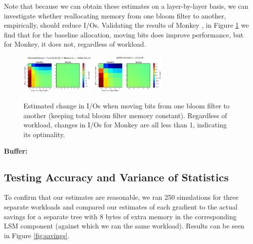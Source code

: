 \documentclass{sig-alternate-05-2015}
\begin{document}
Note that because we can obtain these estimates on a layer-by-layer basis, we can investigate whether reallocating memory from one bloom filter to another, empirically, should reduce I/Os. Validating the results of Monkey \cite{monkey}, in Figure \ref{fig:bloom-realloc} we find that for the baseline allocation, moving bits does improve performance, but for Monkey, it does not, regardless of workload.

\begin{figure}[!htb]
\begin{center}
\includegraphics[width=0.33\textwidth]{bloom-moves-disc.png}
\includegraphics[width=0.33\textwidth]{bloom-moves-zipf.png}
\end{center}
\caption{Estimated change in I/Os when moving bits from one bloom filter to another (keeping total bloom filter memory constant). Regardless of workload, changes in I/Os for Monkey are all less than 1, indicating its optimality.}
\label{fig:bloom-realloc}
\end{figure}

\textbf{Buffer:}

\subsection{Testing Accuracy and Variance of Statistics}

To confirm that our estimates are reasonable, we ran 250 simulations for three
separate workloads and compared our estimates of each gradient to the actual
savings for a separate tree with 8 bytes of extra memory in the corresponding
LSM component (against which we ran the same workload). Results can be seen in
Figure \ref{fig:savings}.
\end{document}
